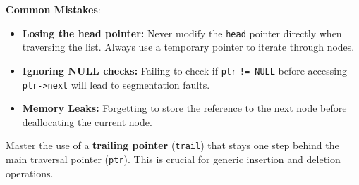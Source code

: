 \begin{remark}
\textbf{Common Mistakes}:
\begin{itemize}
    \item \textbf{Losing the head pointer:} Never modify the \texttt{head} pointer directly when traversing the list. Always use a temporary pointer to iterate through nodes.
    \item \textbf{Ignoring NULL checks:} Failing to check if \texttt{ptr} \texttt{!= NULL} before accessing \texttt{ptr->}\allowbreak\texttt{next} will lead to segmentation faults.
    \item \textbf{Memory Leaks:} Forgetting to store the reference to the next node before deallocating the current node.
\end{itemize}
\end{remark}

\begin{exercise}
Master the use of a \textbf{trailing pointer} (\texttt{trail}) that stays one step behind the main traversal pointer (\texttt{ptr}). This is crucial for generic insertion and deletion operations.
\end{exercise}
